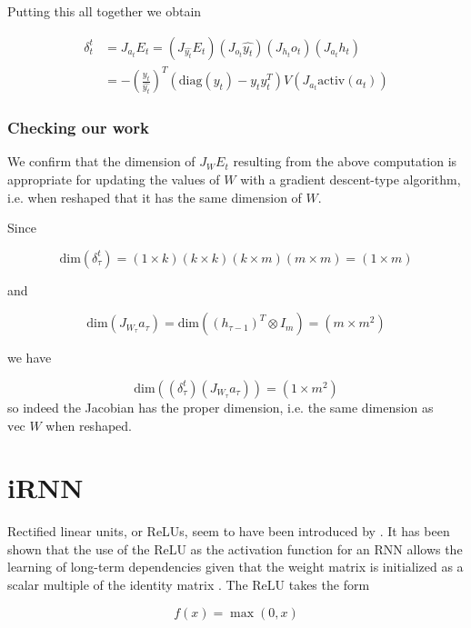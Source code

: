 Putting this all together we obtain

\begin{align*}
  \delta_t^t & = J_{a_t} E_t = (J_{\widehat{y_t}} E_t)(J_{o_t}\widehat{y_t})(J_{h_t}o_t)(J_{a_t}h_t) \\
  & = -\left(\frac{y_t}{\widehat{y_t}}\right)^T \left(\mbox{diag}(y_t) - y_t y_t^T\right) V \left(J_{a_t}\mbox{activ}(a_t)\right)
\end{align*}

\subsubsection{Checking our work}

We confirm that the dimension of $J_W E_t$ resulting from the above computation is appropriate for updating the values of $W$ with a gradient descent-type algorithm, i.e. when reshaped that it has the same dimension of $W$.

Since

\begin{equation*}
\mbox{dim}(\delta_\tau^t) = (1 \times k)(k \times k)(k \times m)(m \times m) = (1 \times m)
\end{equation*}

and

\begin{equation*}
\mbox{dim}(J_{W_\tau} a_\tau) = \mbox{dim}((h_{\tau - 1})^T \otimes I_m) = (m \times m^2)
\end{equation*}

we have

\begin{equation*}
\mbox{dim}((\delta_\tau^t)(J_{W_\tau} a_\tau)) = (1 \times m^2)
\end{equation*}
%
so indeed the Jacobian has the proper dimension, i.e. the same dimension as $\mbox{vec } W$ when reshaped.

\section{iRNN}

Rectified linear units, or ReLUs, seem to have been introduced by \citealt{hahnloser2000digital}. It has been shown that the use of the ReLU as the activation function for an RNN allows the learning of long-term dependencies given that the weight matrix is initialized as a scalar multiple of the identity matrix \cite[p. 2]{DBLP:journals/corr/LeJH15}. The ReLU takes the form

\begin{equation*}
f(x) = \max(0, x)
\end{equation*}

